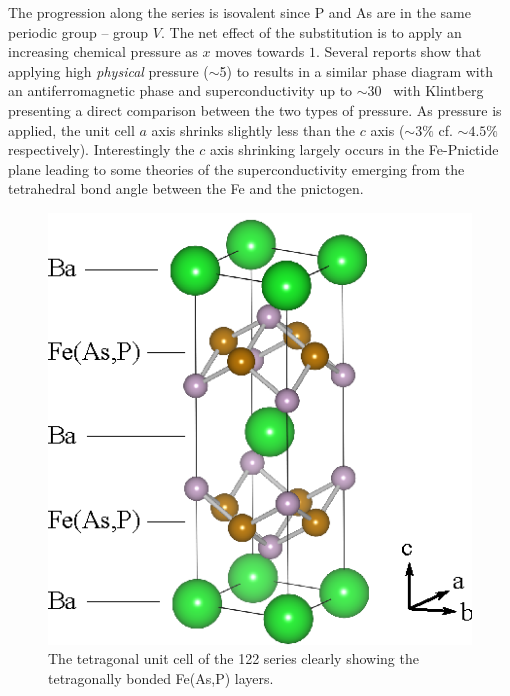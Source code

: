  The progression along the series is isovalent since P and As are in the same periodic group -- group $V$. The net effect of the substitution is to apply an increasing chemical pressure as $x$ moves towards $1$. Several reports show that applying high \emph{physical} pressure ($\sim$\unit{5}{\giga\pascal}) to \BaFeAs results in a similar phase diagram with an antiferromagnetic phase and superconductivity up to $\sim$\unit{30}{\kelvin}~\cite{Yamazaki2010,Colombier2009,Alireza2009} with Klintberg \etal~\cite{Klintberg2010} presenting a direct comparison between the two types of pressure. As pressure is applied, the unit cell $a$ axis shrinks slightly less than the $c$ axis ($\sim3\%$ cf. $\sim4.5\%$ respectively). Interestingly the $c$ axis shrinking largely occurs in the Fe-Pnictide plane leading to some theories of the superconductivity emerging from the tetrahedral bond angle between the Fe and the pnictogen.
\begin{figure}[htbp]
    \begin{center}
        \includegraphics[scale=1.0]{Chapter-Introduction/Figures/UnitCell/UnitCell}
        \caption{The tetragonal unit cell of the 122 \BaFePAs series clearly showing the tetragonally bonded Fe(As,P) layers.}
        \label{Fig:Intro:UnitCell}
    \end{center}
\end{figure}


